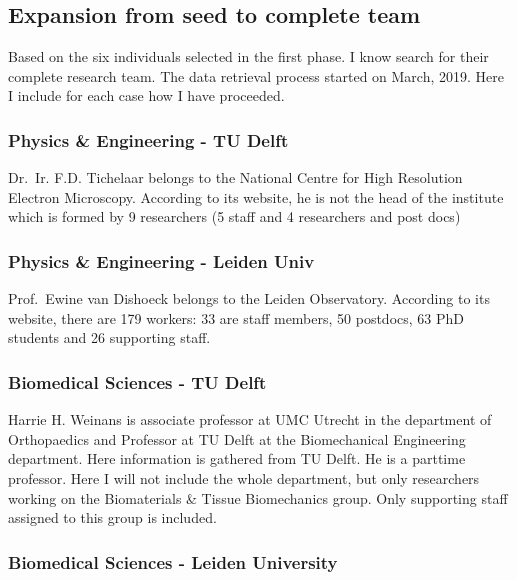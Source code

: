 \documentclass[]{elsarticle} %
\begin{document}
\hypertarget{expansion-from-seed-to-complete-team}{%
\subsection{Expansion from seed to complete
team}\label{expansion-from-seed-to-complete-team}}

Based on the six individuals selected in the first phase. I know search
for their complete research team. The data retrieval process started on
March, 2019. Here I include for each case how I have proceeded.

\hypertarget{physics-engineering---tu-delft}{%
\subsubsection{Physics \& Engineering - TU
Delft}\label{physics-engineering---tu-delft}}

Dr.~Ir. F.D. Tichelaar belongs to the National Centre for High
Resolution Electron Microscopy. According to its website, he is not the
head of the institute which is formed by 9 researchers (5 staff and 4
researchers and post docs)

\hypertarget{physics-engineering---leiden-univ}{%
\subsubsection{Physics \& Engineering - Leiden
Univ}\label{physics-engineering---leiden-univ}}

Prof.~Ewine van Dishoeck belongs to the Leiden Observatory. According to
its website, there are 179 workers: 33 are staff members, 50 postdocs,
63 PhD students and 26 supporting staff.

\hypertarget{biomedical-sciences---tu-delft}{%
\subsubsection{Biomedical Sciences - TU
Delft}\label{biomedical-sciences---tu-delft}}

Harrie H. Weinans is associate professor at UMC Utrecht in the
department of Orthopaedics and Professor at TU Delft at the
Biomechanical Engineering department. Here information is gathered from
TU Delft. He is a parttime professor. Here I will not include the whole
department, but only researchers working on the Biomaterials \& Tissue
Biomechanics group. Only supporting staff assigned to this group is
included.

\hypertarget{biomedical-sciences---leiden-university}{%
\subsubsection{Biomedical Sciences - Leiden
University}\label{biomedical-sciences---leiden-university}}
\end{document}
